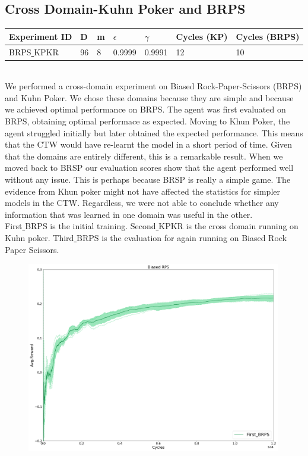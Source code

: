 \documentclass{article}
\theoremstyle{definition}
\newtheorem{primary statistics}[definition]{Primary Statistics}
\newtheorem{auxiliary statistics}[definition]{Auxiliary Statistics}
\begin{document}
\subsection{Cross Domain-Kuhn Poker and BRPS }
 \begin{tabular}{|l|l|l|l|l|l|l|}
 \hline \centering
 Experiment ID& D & m & $\epsilon$ & $\gamma$ & Cycles (KP) & Cycles (BRPS) \\ \hline
BRPS\underline{ }KPKR  & 96       & 8           & 0.9999       & 0.9991             & 12    &  10      \\ \hline    
\end{tabular} \\

We performed a cross-domain experiment on Biased Rock-Paper-Scissors (BRPS) and Kuhn Poker. We chose these domains because they are simple and because we achieved optimal performance on BRPS. The agent was first evaluated on BRPS, obtaining optimal performace as expected. Moving to Khun Poker, the agent struggled initially but later obtained the expected performance. This means that the CTW would have re-learnt the model in a short period of time. Given that the domains are entirely different, this is a remarkable result. When we moved back to BRSP our evaluation scores show that the agent performed well without any issue. This is perhaps because BRSP is really a simple game. The evidence from Khun poker might not have affected the statistics for simpler models in the CTW. Regardless, we were not able to conclude whether any information that was learned in one domain was useful in the other. \\

First\underline{ }BRPS is the initial training. Second\underline{ }KPKR is the cross domain running on Kuhn poker. Third\underline{ }BRPS is the evaluation for again running on Biased Rock Paper Scissors.




 \begin{figure}[!htb]
 \centering
    \includegraphics[width=11.1cm]{First_BRPS}
\end{figure}
\end{document}
